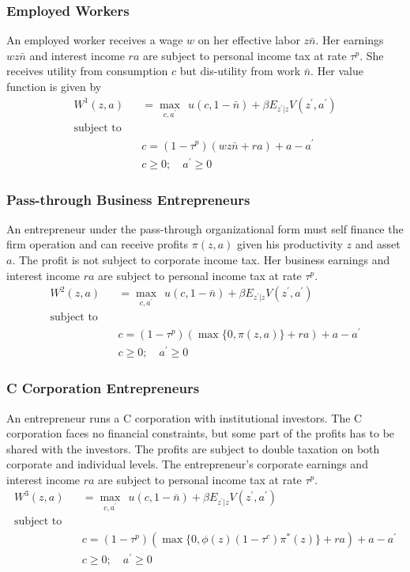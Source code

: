 \documentclass[12pt]{article}
\begin{document}
\subsubsection{Employed Workers}
An employed worker receives a wage $w$ on her effective labor $z\bar{n}$. Her earnings $wz\bar{n}$ and interest income $ra$ are subject to personal income tax at rate $\tau^p$. She receives utility from consumption $c$ but dis-utility from work $\bar{n}$. Her value function is given by
\begin{eqnarray}
W^1(z,a)&&=\max_{ c,a^{\prime} } \ \ u(c,1-\bar{n})+\beta
E_{z^{\prime}|z} V(z^{\prime},a^{\prime})  \label{eqn:W1}\\
\text{subject to}&&\nonumber\\
&& c = (1-\tau^p)(w z \bar{n}+ra)+a-a^{\prime}\nonumber \\
&& c \geq 0;\quad a^{\prime}\geq 0\nonumber
\end{eqnarray}

\subsubsection{Pass-through Business Entrepreneurs}
An entrepreneur under the pass-through organizational form must self finance the firm operation and can receive profits $\pi(z,a)$ given his productivity $z$ and asset $a$. The profit is not subject to corporate income tax. Her business earnings and interest income $ra$ are subject to personal income tax at rate $\tau^p$.
\begin{eqnarray}
W^2(z,a)&&=\max_{ c,a^{\prime} } \ \ u(c,1-\bar{n})+\beta
E_{z^{\prime}|z} V(z^{\prime},a^{\prime})   \label{eqn:W2}\\
\text{subject to}&&\nonumber\\
&& c = (1-\tau^p)(\max\{0,\pi(z,a)\}+ra)+a-a^{\prime}\nonumber \\
&& c \geq 0;\quad a^{\prime}\geq 0\nonumber
\end{eqnarray}

\subsubsection{C Corporation Entrepreneurs}
An entrepreneur runs a C corporation with institutional investors. The C corporation faces no financial constraints, but some part of the profits has to be shared with the investors. The profits are subject to double taxation on both corporate and individual levels. The entrepreneur's corporate earnings and interest income $ra$ are subject to personal income tax at rate $\tau^p$.
\begin{eqnarray}
W^3(z,a)&&=\max_{ c,a^{\prime} } \ \ u(c,1-\bar{n})+\beta
E_{z^{\prime}|z} V(z^{\prime},a^{\prime})  \label{eqn:W3}\\
\text{subject to}&&\nonumber\\
&& c = (1-\tau^p)(\max\{0,\phi(z)(1-\tau^c)\pi^*(z)\}+ra)+a-a^{\prime} \nonumber\\
&& c \geq 0;\quad a^{\prime}\geq 0\nonumber
\end{eqnarray}
\end{document}
